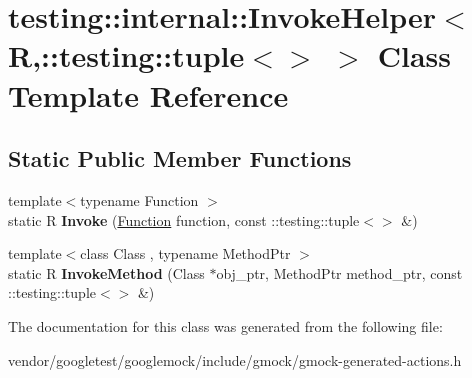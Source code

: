 \hypertarget{classtesting_1_1internal_1_1InvokeHelper_3_01R_00_1_1testing_1_1tuple_3_4_01_4}{}\section{testing\+:\+:internal\+:\+:Invoke\+Helper$<$ R,\+:\+:testing\+:\+:tuple$<$$>$ $>$ Class Template Reference}
\label{classtesting_1_1internal_1_1InvokeHelper_3_01R_00_1_1testing_1_1tuple_3_4_01_4}
\subsection*{Static Public Member Functions}
\begin{DoxyCompactItemize}
\item 
{\footnotesize template$<$typename Function $>$ }\\static R {\bfseries Invoke} (\hyperlink{structtesting_1_1internal_1_1Function}{Function} function, const \+::testing\+::tuple$<$$>$ \&)\hypertarget{classtesting_1_1internal_1_1InvokeHelper_3_01R_00_1_1testing_1_1tuple_3_4_01_4_aa695e527af9f3efc6c8098c2467e5e7c}{}\label{classtesting_1_1internal_1_1InvokeHelper_3_01R_00_1_1testing_1_1tuple_3_4_01_4_aa695e527af9f3efc6c8098c2467e5e7c}

\item 
{\footnotesize template$<$class Class , typename Method\+Ptr $>$ }\\static R {\bfseries Invoke\+Method} (Class $\ast$obj\+\_\+ptr, Method\+Ptr method\+\_\+ptr, const \+::testing\+::tuple$<$$>$ \&)\hypertarget{classtesting_1_1internal_1_1InvokeHelper_3_01R_00_1_1testing_1_1tuple_3_4_01_4_acd2b09ae48134b49f388be348b0d8c72}{}\label{classtesting_1_1internal_1_1InvokeHelper_3_01R_00_1_1testing_1_1tuple_3_4_01_4_acd2b09ae48134b49f388be348b0d8c72}

\end{DoxyCompactItemize}


The documentation for this class was generated from the following file\+:\begin{DoxyCompactItemize}
\item 
vendor/googletest/googlemock/include/gmock/gmock-\/generated-\/actions.\+h\end{DoxyCompactItemize}
